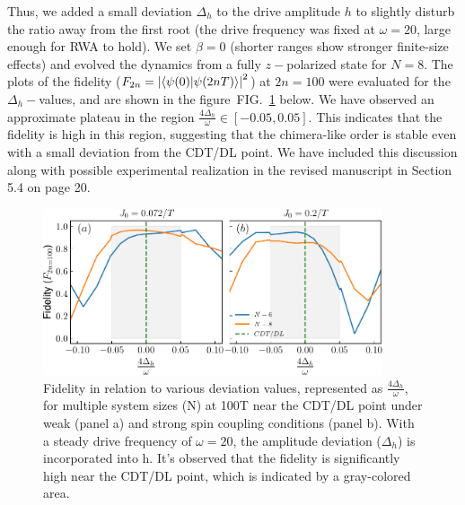 \documentclass[aps,prb,reprint,showpacs,floatfix,superscriptaddress, onecolumn, nofootinbib, 10pt]{revtex4-2}
\newcommand{\figref}[1]{FIG.~\ref{#1}}
\begin{document}
\begin{enumerate}
\begin{enumerate}
\begin{enumerate}
{			Thus, we added a small deviation $\Delta_h$  to the drive amplitude $h$ to slightly disturb the ratio away from the first root (the  drive frequency was fixed at $\omega = 20$, large enough for RWA to hold). We set $\beta=0$ (shorter ranges show stronger finite-size effects) and evolved the dynamics from a fully $z-$polarized state for $N = 8$.
			The plots of the fidelity ($F_{2n} = \abs{\braket{\psi(0)}{\psi (2nT)}}^2$) at $2n=100$ were evaluated for the $\Delta_h-$values, and are shown in the figure~\figref{Fig:aroundCDT} below. 
			We have observed an approximate plateau in the region $\displaystyle\frac{4\Delta_h}{\omega} \in[-0.05, 0.05]$. This indicates that the fidelity is high in this region, suggesting that the chimera-like order is stable even with a small deviation from the CDT/DL point. We have included this discussion along with possible  experimental realization in the revised manuscript in Section 5.4 on page 20.	
			\begin{figure}[h!]
				\begin{center}
					\includegraphics[width=10cm]{./figs/figure14.pdf}
				\end{center}
				\caption{Fidelity in relation to various deviation values, represented as $\frac{4\Delta_h}{\omega}$, for multiple system sizes (N) at 100T near the CDT/DL point under weak (panel a) and strong spin coupling conditions (panel b). With a steady drive frequency of $\omega= 20$, the amplitude deviation ($\Delta_h$) is incorporated into h. It's observed that the fidelity is significantly high near the CDT/DL point, which is indicated by a gray-colored area.}
				\label{Fig:aroundCDT}
			\end{figure}
		
			}
		\end{enumerate}
		

\end{enumerate}
\end{enumerate}
\end{document}
